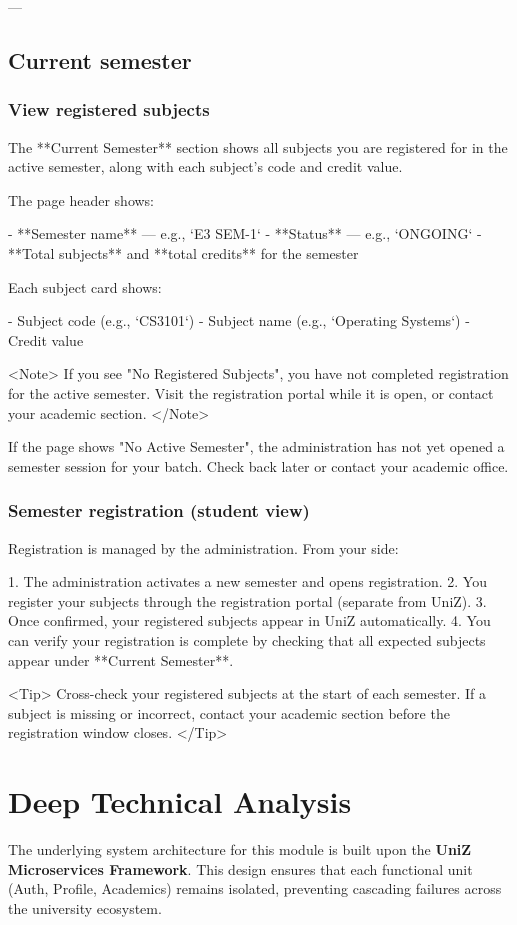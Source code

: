 ---

\subsection{Current semester}

\subsubsection{View registered subjects}

The **Current Semester** section shows all subjects you are registered for in the active semester, along with each subject's code and credit value.

The page header shows:

- **Semester name** — e.g., `E3 SEM-1`
- **Status** — e.g., `ONGOING`
- **Total subjects** and **total credits** for the semester

Each subject card shows:

- Subject code (e.g., `CS3101`)
- Subject name (e.g., `Operating Systems`)
- Credit value

<Note>
  If you see "No Registered Subjects", you have not completed registration for
  the active semester. Visit the registration portal while it is open, or
  contact your academic section.
</Note>

If the page shows "No Active Semester", the administration has not yet opened a semester session for your batch. Check back later or contact your academic office.

\subsubsection{Semester registration (student view)}

Registration is managed by the administration. From your side:

1. The administration activates a new semester and opens registration.
2. You register your subjects through the registration portal (separate from UniZ).
3. Once confirmed, your registered subjects appear in UniZ automatically.
4. You can verify your registration is complete by checking that all expected subjects appear under **Current Semester**.

<Tip>
  Cross-check your registered subjects at the start of each semester. If a
  subject is missing or incorrect, contact your academic section before the
  registration window closes.
</Tip>


\section{Deep Technical Analysis}
The underlying system architecture for this module is built upon the \textbf{UniZ Microservices Framework}. 
This design ensures that each functional unit (Auth, Profile, Academics) remains isolated, preventing cascading failures across the university ecosystem.

